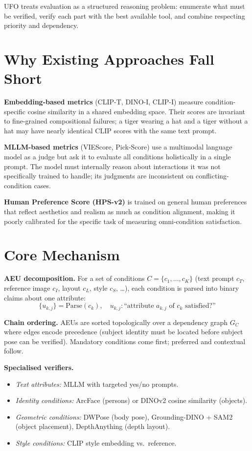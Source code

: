 \documentclass[10pt,twocolumn]{article}
\begin{document}
UFO treats evaluation as a structured reasoning problem: enumerate what
must be verified, verify each part with the best available tool, and
combine respecting priority and dependency.

\section{Why Existing Approaches Fall Short}

\textbf{Embedding-based metrics} (CLIP-T, DINO-I, CLIP-I) measure
condition-specific cosine similarity in a shared embedding space.
Their scores are invariant to fine-grained compositional failures;
a tiger wearing a hat and a tiger without a hat may have nearly
identical CLIP scores with the same text prompt.

\textbf{MLLM-based metrics} (VIEScore, Pick-Score) use a multimodal
language model as a judge but ask it to evaluate all conditions
holistically in a single prompt. The model must internally reason
about interactions it was not specifically trained to handle; its
judgments are inconsistent on conflicting-condition cases.

\textbf{Human Preference Score (HPS-v2)} is trained on general human
preferences that reflect aesthetics and realism as much as condition
alignment, making it poorly calibrated for the specific task of
measuring omni-condition satisfaction.

\section{Core Mechanism}

\textbf{AEU decomposition.} For a set of conditions $C = \{c_1, \ldots, c_K\}$
(text prompt $c_T$, reference image $c_I$, layout $c_L$, style $c_S$, \ldots),
each condition is parsed into binary claims about one attribute:
\[
\{u_{k,j}\} = \text{Parse}(c_k), \quad
u_{k,j} : \text{``attribute } a_{k,j} \text{ of } c_k \text{ satisfied?''}
\]

\textbf{Chain ordering.} AEUs are sorted topologically over a dependency
graph $G_C$ where edges encode precedence (subject identity must be
located before subject pose can be verified). Mandatory conditions come
first; preferred and contextual follow.

\textbf{Specialised verifiers.}
\begin{itemize}[itemsep=1pt,parsep=0pt]
  \item \emph{Text attributes:} MLLM with targeted yes/no prompts.
  \item \emph{Identity conditions:} ArcFace (persons) or DINOv2
    cosine similarity (objects).
  \item \emph{Geometric conditions:} DWPose (body pose), Grounding-DINO
    + SAM2 (object placement), DepthAnything (depth layout).
  \item \emph{Style conditions:} CLIP style embedding vs.\ reference.
\end{itemize}
\end{document}
